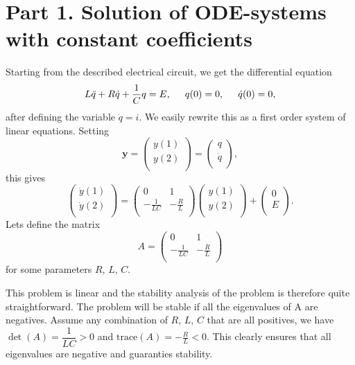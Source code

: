 \section*{Part 1. Solution of ODE-systems with constant coefficients}

Starting from the described electrical circuit, we get the differential equation
$$L\ddot{q}+R\dot{q}+\frac{1}{C}q = E,\hspace*{5mm}q(0)=0,\hspace*{5mm}\dot{q}(0)=0,$$
after defining the variable $\dot{q}=i$. We easily rewrite this as a first order system of linear equations. Setting $$\textbf{y}= \begin{pmatrix}
y(1)\\
y(2)\\
\end{pmatrix} = \begin{pmatrix}
q\\
\dot{q}\\
\end{pmatrix},$$
this gives
$$\begin{pmatrix}
\dot{y}(1)\\
\dot{y}(2)\\
\end{pmatrix}= \begin{pmatrix}
0 & 1\\
- \frac{1}{LC} & -\frac{R}{L}\\
\end{pmatrix}\begin{pmatrix}
y(1)\\
y(2)\\
\end{pmatrix}
+ \begin{pmatrix}
0\\
E\\
\end{pmatrix}.$$
Lets define the matrix 
$$A=\begin{pmatrix}
0 & 1\\
- \frac{1}{LC} & -\frac{R}{L}\\
\end{pmatrix}$$ for some parameters $R$, $L$, $C$.

This problem is linear and the stability analysis of the problem is therefore quite straightforward. The problem will be stable if  all the eigenvalues of A are negatives. Assume any combination of $R$, $L$, $C$ that are all positives, we have $\det(A)=\dfrac{1}{LC}>0$ and $\text{trace}(A)=-\frac{R}{L}<0$. This clearly ensures that all eigenvalues are negative and guaranties stability.

